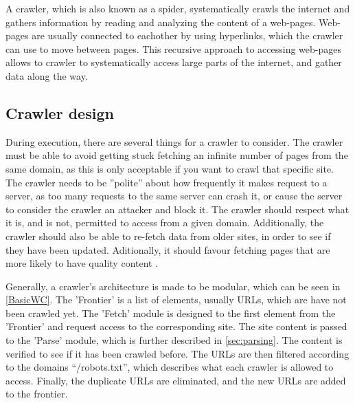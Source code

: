 A crawler, which is also known as a spider, systematically crawls the internet
and gathers information by reading and analyzing the content of a web-pages.
Web-pages are usually connected to eachother by using hyperlinks, which the
crawler can use to move between pages. This recursive approach to accessing
web-pages allows to crawler to systematically access large parts of the
internet, and gather data along the way.

\subsection{Crawler design}%
During execution, there are several things for a crawler to consider.
The crawler must be able to avoid getting stuck fetching an infinite number of
pages from the same domain, as this is only acceptable if you want to crawl that
specific site.
The crawler needs to be ''polite'' about how frequently it makes request to a
server, as too many requests to the same server can crash it, or cause the
server to consider the crawler an attacker and block it.
The crawler should respect what it is, and is not, permitted to access from a
given domain. Additionally, the crawler should also be able to re-fetch data
from older sites, in order to see if they have been updated. Aditionally, it
should favour fetching pages that are more likely to have quality content \citep[Ch.
20.1]{manning2008introduction}.\nl
 
Generally, a crawler's architecture is made to be modular, which can be seen in
\autoref{BasicWC}. The 'Frontier' is a list of elements, usually URLs, which are
have not been crawled yet. The 'Fetch' module is designed to the first element from
the 'Frontier' and request access to the corresponding site. The site content is
passed to the 'Parse' module, which is further described in
\autoref{sec:parsing}. The content is verified to see if it has been crawled
before. The URLs are then filtered according to the domains ``/robots.txt'',
which describes what each crawler is allowed to access. Finally, the duplicate
URLs are eliminated, and the new URLs are added to the frontier.\nl



